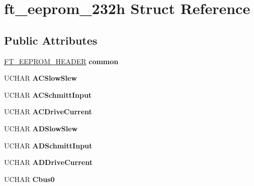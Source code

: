 \hypertarget{structft__eeprom__232h}{}\section{ft\+\_\+eeprom\+\_\+232h Struct Reference}
\label{structft__eeprom__232h}
\subsection*{Public Attributes}
\begin{DoxyCompactItemize}
\item 
\mbox{\label{structft__eeprom__232h_a37234d2dd02343759c92fd97e4835ccb}} 
\hyperlink{structft__eeprom__header}{F\+T\+\_\+\+E\+E\+P\+R\+O\+M\+\_\+\+H\+E\+A\+D\+ER} {\bfseries common}
\item 
\mbox{\label{structft__eeprom__232h_a3cfbbe62de0029839534fb469a9b50c9}} 
U\+C\+H\+AR {\bfseries A\+C\+Slow\+Slew}
\item 
\mbox{\label{structft__eeprom__232h_a025e35a0ae019370a4ea968f1cc2df2b}} 
U\+C\+H\+AR {\bfseries A\+C\+Schmitt\+Input}
\item 
\mbox{\label{structft__eeprom__232h_a8cb3fbf23ced09e59165178aee3f3c57}} 
U\+C\+H\+AR {\bfseries A\+C\+Drive\+Current}
\item 
\mbox{\label{structft__eeprom__232h_a192cf979058aac20dbea8840a35f1bae}} 
U\+C\+H\+AR {\bfseries A\+D\+Slow\+Slew}
\item 
\mbox{\label{structft__eeprom__232h_a9d6cc1ae3e56bad64ba55a3db9cd845c}} 
U\+C\+H\+AR {\bfseries A\+D\+Schmitt\+Input}
\item 
\mbox{\label{structft__eeprom__232h_a6aa2aea692700ed5e98a958819db3944}} 
U\+C\+H\+AR {\bfseries A\+D\+Drive\+Current}
\item 
\mbox{\label{structft__eeprom__232h_aac7c9328aa4b74813b1fbd73a0a6afbd}} 
U\+C\+H\+AR {\bfseries Cbus0}
\item 
\mbox{\label{structft__eeprom__232h_ac56f116aab26598caa87cc9ac28376af}} 

\end{DoxyCompactItemize}
